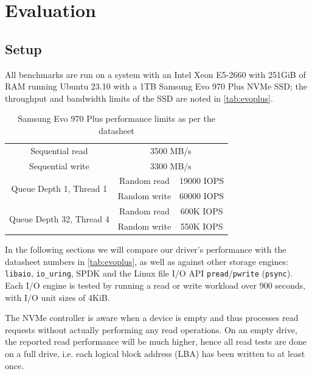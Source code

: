 \chapter{Evaluation}\label{chapter:eval}
\section{Setup}
All benchmarks are run on a system with an Intel Xeon E5-2660 with 251GiB of RAM running Ubuntu 23.10 with a 1TB Samsung Evo 970 Plus NVMe SSD; the throughput and bandwidth limits of the SSD are noted in \autoref{tab:evoplus}.

\begin{table}
    \centering
    \begin{tabular} { ||c|c|c|| }
        \cline{1-3}
        Sequential read & \multicolumn{2}{|c||}{3500 MB/s} \\ \cline{1-3}
        Sequential write & \multicolumn{2}{|c||}{3300 MB/s} \\ \cline{1-3}
        \multirow{2}{*}{Queue Depth 1, Thread 1} & Random read & 19000 IOPS \\ \cline{2-3}
                                                    & Random write & 60000 IOPS \\ \cline{1-3}
        \multirow{2}{*}{Queue Depth 32, Thread 4} & Random read & 600K IOPS \\ \cline{2-3}
                                                    & Random write & 550K IOPS \\ \cline{1-3}
    \end{tabular}
    \caption{Samsung Evo 970 Plus performance limits as per the datasheet}
    \label{tab:evoplus}
\end{table}

In the following sections we will compare our driver's performance with the datasheet numbers in \autoref{tab:evoplus}, as well as against other storage engines: \texttt{libaio}, \texttt{io\_uring}, SPDK and the Linux file I/O API \texttt{pread}/\texttt{pwrite} (\texttt{psync}). Each I/O engine is tested by running a read or write workload over 900 seconds, with I/O unit sizes of 4KiB.

The NVMe controller is aware when a device is empty and thus processes read requests without actually performing any read operations. On an empty drive, the reported read performance will be much higher, hence all read tests are done on a full drive, i.e. each logical block address (LBA) has been written to at least once.

